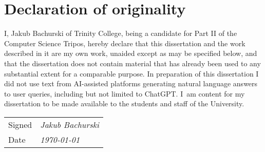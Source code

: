 \section*{Declaration of originality}

I, Jakub Bachurski of Trinity College, being a candidate for Part II of the Computer Science Tripos, hereby declare that this dissertation and the work described in it are my own work, unaided except as may be specified below, and that the dissertation does not contain material that has already been used to any substantial extent for a comparable purpose. In preparation of this dissertation I did not use text from AI-assisted platforms generating natural language answers to user queries, including but not limited to ChatGPT. I~am content for my dissertation to be made available to the students and staff of the University.

\vspace{1em}

\vspace{1cm}
\begin{tabular}{ll}
    Signed & \textit{Jakub Bachurski} \\
    Date & \textit{\today}
\end{tabular}

